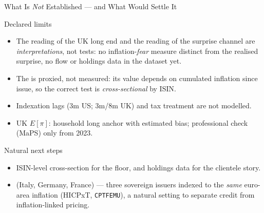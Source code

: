 \begin{frame}[t]{What Is \emph{Not} Established --- and What Would Settle It}
\vspace{0.15cm}
\small
\begin{block}{Declared limits}
\begin{itemize}\itemsep=0.04cm\small
  \item The  reading of the UK long end and the 
        reading of the surprise channel are \emph{interpretations}, not tests: no inflation-\emph{fear}
        measure distinct from the realised surprise, no flow or holdings data in the dataset yet.
  \item The  is proxied, not measured: its value depends on cumulated
        inflation since issue, so the correct test is \emph{cross-sectional} by ISIN.
  \item Indexation lags (3m US; 3m/8m UK) and tax treatment are not modelled.
  \item UK $E[\pi]$: household long anchor with estimated bias; professional check (MaPS) only from 2023.
\end{itemize}
\end{block}
\begin{block}{Natural next steps}
\begin{itemize}\itemsep=0.04cm\small
  \item ISIN-level cross-section for the floor, and holdings data for the clientele story.
  \item {} (Italy, Germany, France) --- three sovereign issuers
        indexed to the \emph{same} euro-area inflation (HICPxT, \texttt{CPTFEMU}), a natural
        setting to separate credit from inflation-linked pricing.
\end{itemize}
\end{block}
\end{frame}


